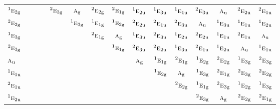 \documentclass[10pt,a4paper]{article}
\numberwithin{equation}{section}
\newcommand{\irr}[1]{\text{\normalfont\scshape #1}}
\newcommand{\conjpair}[1]{{}^{#1}}
\newcommand{\ptag}[1]{\mathrm{#1}}
\begin{document}
{\begin{longtable}{@{}lcccccccccccccc@{}}
$\conjpair{1}\irr{e}_{2\ptag{g}}$ &  &  &  & $\conjpair{2}\irr{e}_{3\ptag{g}}$ & $\irr{a}_{\ptag{g}}$ & $\conjpair{2}\irr{e}_{2\ptag{g}}$ & $\conjpair{2}\irr{e}_{1\ptag{g}}$ & $\conjpair{1}\irr{e}_{2\ptag{u}}$ & $\conjpair{1}\irr{e}_{3\ptag{u}}$ & $\conjpair{1}\irr{e}_{1\ptag{u}}$ & $\conjpair{2}\irr{e}_{3\ptag{u}}$ & $\irr{a}_{\ptag{u}}$ & $\conjpair{2}\irr{e}_{2\ptag{u}}$ & $\conjpair{2}\irr{e}_{1\ptag{u}}$\\
$\conjpair{2}\irr{e}_{2\ptag{g}}$ &  &  &  &  & $\conjpair{1}\irr{e}_{3\ptag{g}}$ & $\conjpair{1}\irr{e}_{1\ptag{g}}$ & $\conjpair{1}\irr{e}_{2\ptag{g}}$ & $\conjpair{2}\irr{e}_{2\ptag{u}}$ & $\conjpair{2}\irr{e}_{1\ptag{u}}$ & $\conjpair{2}\irr{e}_{3\ptag{u}}$ & $\irr{a}_{\ptag{u}}$ & $\conjpair{1}\irr{e}_{3\ptag{u}}$ & $\conjpair{1}\irr{e}_{1\ptag{u}}$ & $\conjpair{1}\irr{e}_{2\ptag{u}}$\\
$\conjpair{1}\irr{e}_{3\ptag{g}}$ &  &  &  &  &  & $\conjpair{2}\irr{e}_{1\ptag{g}}$ & $\irr{a}_{\ptag{g}}$ & $\conjpair{1}\irr{e}_{3\ptag{u}}$ & $\conjpair{2}\irr{e}_{3\ptag{u}}$ & $\conjpair{1}\irr{e}_{2\ptag{u}}$ & $\conjpair{2}\irr{e}_{2\ptag{u}}$ & $\conjpair{1}\irr{e}_{1\ptag{u}}$ & $\conjpair{2}\irr{e}_{1\ptag{u}}$ & $\irr{a}_{\ptag{u}}$\\
$\conjpair{2}\irr{e}_{3\ptag{g}}$ &  &  &  &  &  &  & $\conjpair{1}\irr{e}_{1\ptag{g}}$ & $\conjpair{2}\irr{e}_{3\ptag{u}}$ & $\conjpair{2}\irr{e}_{2\ptag{u}}$ & $\conjpair{1}\irr{e}_{3\ptag{u}}$ & $\conjpair{2}\irr{e}_{1\ptag{u}}$ & $\conjpair{1}\irr{e}_{2\ptag{u}}$ & $\irr{a}_{\ptag{u}}$ & $\conjpair{1}\irr{e}_{1\ptag{u}}$\\
$\irr{a}_{\ptag{u}}$ &  &  &  &  &  &  &  & $\irr{a}_{\ptag{g}}$ & $\conjpair{1}\irr{e}_{1\ptag{g}}$ & $\conjpair{2}\irr{e}_{1\ptag{g}}$ & $\conjpair{1}\irr{e}_{2\ptag{g}}$ & $\conjpair{2}\irr{e}_{2\ptag{g}}$ & $\conjpair{1}\irr{e}_{3\ptag{g}}$ & $\conjpair{2}\irr{e}_{3\ptag{g}}$\\
$\conjpair{1}\irr{e}_{1\ptag{u}}$ &  &  &  &  &  &  &  &  & $\conjpair{1}\irr{e}_{2\ptag{g}}$ & $\irr{a}_{\ptag{g}}$ & $\conjpair{1}\irr{e}_{3\ptag{g}}$ & $\conjpair{2}\irr{e}_{1\ptag{g}}$ & $\conjpair{2}\irr{e}_{3\ptag{g}}$ & $\conjpair{2}\irr{e}_{2\ptag{g}}$\\
$\conjpair{2}\irr{e}_{1\ptag{u}}$ &  &  &  &  &  &  &  &  &  & $\conjpair{2}\irr{e}_{2\ptag{g}}$ & $\conjpair{1}\irr{e}_{1\ptag{g}}$ & $\conjpair{2}\irr{e}_{3\ptag{g}}$ & $\conjpair{1}\irr{e}_{2\ptag{g}}$ & $\conjpair{1}\irr{e}_{3\ptag{g}}$\\
$\conjpair{1}\irr{e}_{2\ptag{u}}$ &  &  &  &  &  &  &  &  &  &  & $\conjpair{2}\irr{e}_{3\ptag{g}}$ & $\irr{a}_{\ptag{g}}$ & $\conjpair{2}\irr{e}_{2\ptag{g}}$ & $\conjpair{2}\irr{e}_{1\ptag{g}}$\\

\end{longtable}}
\end{document}
